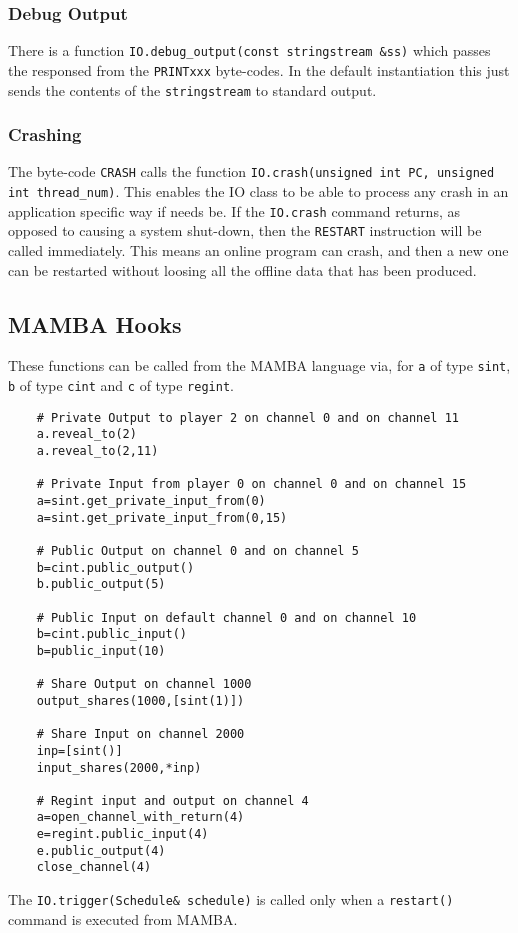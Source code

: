 \subsubsection{Debug Output}
There is a function \verb+IO.debug_output(const stringstream &ss)+
which passes the responsed from the \verb+PRINTxxx+ byte-codes.
In the default instantiation this just sends the contents
of the \verb+stringstream+ to standard output.

\subsubsection{Crashing}
The byte-code \verb+CRASH+ calls the function
\verb+IO.crash(unsigned int PC, unsigned int thread_num)+.
This enables the IO class to be able to process any crash
in an application specific way if needs be.
If the \verb+IO.crash+ command returns, as opposed to causing
a system shut-down, then the \verb+RESTART+ instruction will
be called immediately.
This means an online program can crash, and then a new one
can be restarted without loosing all the offline data that
has been produced.

\subsection{MAMBA Hooks}
These functions can be called from the MAMBA language via,
for \verb+a+ of type \verb+sint+, \verb+b+ of type \verb+cint+
and \verb+c+ of type \verb+regint+.
\begin{verbatim}
    # Private Output to player 2 on channel 0 and on channel 11
    a.reveal_to(2)
    a.reveal_to(2,11)

    # Private Input from player 0 on channel 0 and on channel 15
    a=sint.get_private_input_from(0)
    a=sint.get_private_input_from(0,15)

    # Public Output on channel 0 and on channel 5
    b=cint.public_output()
    b.public_output(5)

    # Public Input on default channel 0 and on channel 10
    b=cint.public_input()
    b=public_input(10)

    # Share Output on channel 1000
    output_shares(1000,[sint(1)])

    # Share Input on channel 2000
    inp=[sint()]
    input_shares(2000,*inp)

    # Regint input and output on channel 4
    a=open_channel_with_return(4)
    e=regint.public_input(4)
    e.public_output(4)
    close_channel(4)
\end{verbatim}
The \verb+IO.trigger(Schedule& schedule)+ is called only when a \verb+restart()+ command
is executed from MAMBA.
